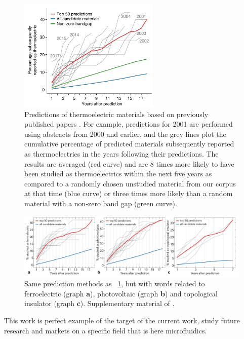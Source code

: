 \begin{figure}[]
	\centering
	\includegraphics[width=0.6\textwidth]{imgs/Tshitoyan2019_Material_Predictions_02}
	\caption{Predictions of thermoelectric materials based on previously published papers  \citep{Tshitoyan2019}.
		\newline
		For example, predictions for 2001 are performed using abstracts from 2000 and earlier, and the grey lines plot the cumulative percentage of predicted materials subsequently reported as thermoelectrics in the years following their predictions.
		The results are averaged (red curve) and are 8 times more likely to have been studied as thermoelectrics within the next five years as compared to a randomly chosen unstudied material from our corpus at that time (blue curve) or three times more likely than a random material with a non-zero band gap (green curve).
	}
	\label{MaterialPrediction02}
\end{figure}
\begin{figure}[]
	\centering
	\includegraphics[width=1.0\textwidth]{imgs/Tshitoyan2019_Material_Predictions_03}
	\caption{Same prediction methods as \fig~\ref{MaterialPrediction02}, but with words related to ferroelectric (graph \textbf{a}), photovoltaic (graph \textbf{b}) and topological insulator  (graph \textbf{c}). 
	Supplementary material of \citep{Tshitoyan2019}.}
	\label{MaterialPrediction03}
\end{figure}


This work is perfect example of the target of the current work, \ie study future research and markets on a specific field that is here microfluidics. 

